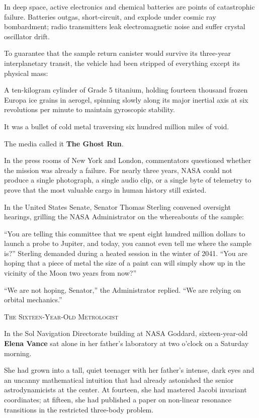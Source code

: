 \documentclass[12pt,twoside,openright]{book}
\newcommand{\sceneheader}[1]{%
  \par\vspace{1.8em}%
  {\noindent\centering\scshape\large #1\par}%
  \vspace{1.0em}%
  \noindent%
}
\newcommand{\dinkus}{%
  \par\vspace{1.2em}%
  {\noindent\centering{\large $\ast\quad\ast\quad\ast$}\par}%
  \vspace{1.2em}%
  \noindent%
}
\begin{document}
In deep space, active electronics and chemical batteries are points of
catastrophic failure. Batteries outgas, short-circuit, and explode under
cosmic ray bombardment; radio transmitters leak electromagnetic noise
and suffer crystal oscillator drift.

To guarantee that the sample return canister would survive its
three-year interplanetary transit, the vehicle had been stripped of
everything except its physical mass:

A ten-kilogram cylinder of Grade 5 titanium, holding fourteen thousand
frozen Europa ice grains in aerogel, spinning slowly along its major
inertial axis at six revolutions per minute to maintain gyroscopic
stability.

It was a bullet of cold metal traversing six hundred million miles of
void.

The media called it \textbf{The Ghost Run}.

In the press rooms of New York and London, commentators questioned
whether the mission was already a failure. For nearly three years, NASA
could not produce a single photograph, a single audio clip, or a single
byte of telemetry to prove that the most valuable cargo in human history
still existed.

In the United States Senate, Senator Thomas Sterling convened oversight
hearings, grilling the NASA Administrator on the whereabouts of the
sample:

``You are telling this committee that we spent eight hundred million
dollars to launch a probe to Jupiter, and today, you cannot even tell me
where the sample is?'' Sterling demanded during a heated session in the
winter of 2041. ``You are hoping that a piece of metal the size of a
paint can will simply show up in the vicinity of the Moon two years from
now?''

``We are not hoping, Senator,'' the Administrator replied. ``We are
relying on orbital mechanics.''

\dinkus

\sceneheader{The Sixteen-Year-Old
Metrologist}

In the Sol Navigation Directorate building at NASA Goddard,
sixteen-year-old \textbf{Elena Vance} sat alone in her father's
laboratory at two o'clock on a Saturday morning.

She had grown into a tall, quiet teenager with her father's intense,
dark eyes and an uncanny mathematical intuition that had already
astonished the senior astrodynamicists at the center. At fourteen, she
had mastered Jacobi invariant coordinates; at fifteen, she had published
a paper on non-linear resonance transitions in the restricted three-body
problem.
\end{document}
